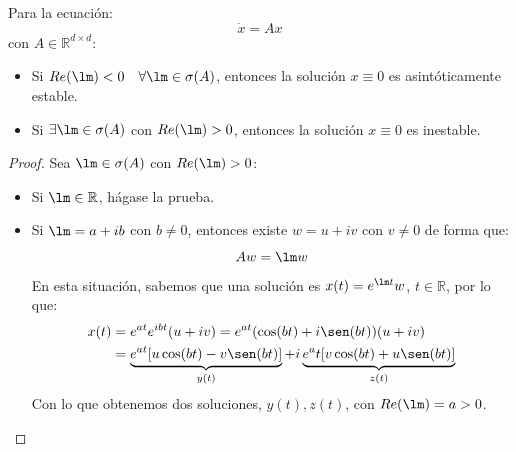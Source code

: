 \begin{teo}
    Para la ecuación:
    \begin{equation*}
        \dot{x} = Ax
    \end{equation*}
    con $A\in \mathbb{R}^{d\times d}$:
    \begin{itemize}
        \item Si $Re(\lm) < 0\quad \forall \lm \in \sigma(A)$, entonces la solución $x\equiv 0$ es asintóticamente estable.
        \item Si $\exists \lm \in \sigma(A)$ con $Re(\lm)>0$, entonces la solución $x\equiv 0$ es inestable.
    \end{itemize}
    \begin{proof}
        Sea $\lm\in \sigma(A)$ con $Re(\lm)>0$: 
        \begin{itemize}
            \item Si $\lm \in \mathbb{R}$, hágase la prueba. %
            \item Si $\lm = a+ib$ con $b\neq 0$, entonces existe $w = u+iv$ con $v\neq 0$ de forma que:
                \begin{equation*}
                    Aw = \lm w
                \end{equation*}
                En esta situación, sabemos que una solución es $x(t) = e^{\lm t}w$, $t\in \mathbb{R}$, por lo que:
                \begin{align*}
                    x(t) &= e^{at} e^{ibt}(u+iv) = e^{at}(\cos(bt)+i\sen(bt))(u+iv) \\
                         &= \underbrace{e^{at}[u\cos(bt) - v\sen(bt)] }_{y(t)}+ i\underbrace{e^at[v\cos(bt) + u\sen(bt)]}_{z(t)}
                \end{align*}
                Con lo que obtenemos dos soluciones, $y(t),z(t)$, con $Re(\lm) = a > 0$.


\end{itemize}
\end{proof}
\end{teo}
